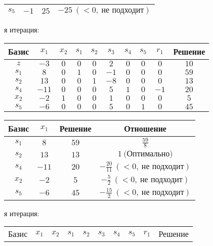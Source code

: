 \documentclass{article}%
\begin{document}
\begin{flushleft}
\begin{tabular}{|cccc|}
$s_{5}$&$-1$&$25$&$-25\: (< 0, \: \text{не подходит})$\\%
\hline%
\end{tabular}%
\newline%
\newline%
я итерация: %
\newline%
\newline%
\renewcommand{\arraystretch}{1.3}%
\begin{tabular}{|c|cccccccc|c|}%
\hline%
Базис&$x_{1}$&$x_{2}$&$s_{1}$&$s_{2}$&$s_{3}$&$s_{4}$&$s_{5}$&$r_{1}$&Решение\\%
\hline%
$z$&$-3$&$0$&$0$&$0$&$2$&$0$&$0$&$0$&$10$\\%
\hline%
$s_{1}$&$8$&$0$&$1$&$0$&$-1$&$0$&$0$&$0$&$59$\\%
$s_{2}$&$13$&$0$&$0$&$1$&$-8$&$0$&$0$&$0$&$13$\\%
$s_{4}$&$-11$&$0$&$0$&$0$&$5$&$1$&$0$&$-1$&$20$\\%
$x_{2}$&$-2$&$1$&$0$&$0$&$1$&$0$&$0$&$0$&$5$\\%
$s_{5}$&$-6$&$0$&$0$&$0$&$5$&$0$&$1$&$0$&$45$\\%
\hline%
\end{tabular}%
\newline%
\newline%
\newline%
\begin{tabular}{|cccc|}%
\hline%
Базис&$x_{1}$&Решение&Отношение\\%
\hline%
$s_{1}$&$8$&$59$&$\frac{59}{8}$\\%
$s_{2}$&$13$&$13$&$1\: \text{(Оптимально)}$\\%
$s_{4}$&$-11$&$20$&$-\frac{20}{11}\: (< 0, \: \text{не подходит})$\\%
$x_{2}$&$-2$&$5$&$-\frac{5}{2}\: (< 0, \: \text{не подходит})$\\%
$s_{5}$&$-6$&$45$&$-\frac{15}{2}\: (< 0, \: \text{не подходит})$\\%
\hline%
\end{tabular}%
\newline%
\newline%
я итерация: %
\newline%
\newline%
\renewcommand{\arraystretch}{1.3}%
\begin{tabular}{|c|cccccccc|c|}%
\hline%
Базис&$x_{1}$&$x_{2}$&$s_{1}$&$s_{2}$&$s_{3}$&$s_{4}$&$s_{5}$&$r_{1}$&Решение\\%

\end{tabular}
\end{flushleft}
\end{document}

